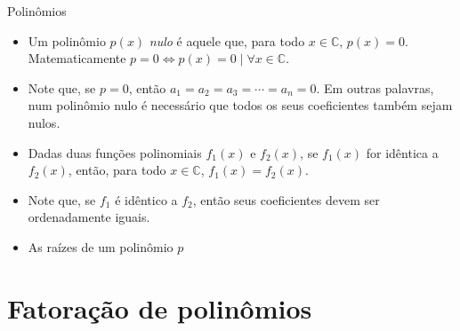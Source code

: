 \documentclass[14pt, aspectratio=169]{beamer}
\newcommand{\C}{\mathbb{C}}
\newcommand{\skipframe}{\vspace{10.0cm}}
\begin{document}
\begin{frame}[allowframebreaks]{Polinômios}
\begin{itemize}
    \skipframe

    \item Um polinômio $p(x)$ \emph{nulo} é aquele que, para todo $x \in \C$, $p(x) = 0$. Matematicamente $p = 0 \Leftrightarrow p(x) = 0 \mid \forall x \in \C$.

    \item Note que, se $p = 0$, então $a_1 = a_2 = a_3 = \cdots = a_n = 0$. Em outras palavras, num polinômio nulo é necessário que todos os seus coeficientes também sejam nulos.

    \skipframe

    \item Dadas duas funções polinomiais $f_1(x)$ e $f_2(x)$, se $f_1(x)$ for idêntica a $f_2(x)$, então, para todo $x \in \C$, $f_1(x) = f_2(x)$.

    \item Note que, se $f_1$ é idêntico a $f_2$, então seus coeficientes devem ser ordenadamente iguais.

    \skipframe

    \item As raízes de um polinômio $p$
\end{itemize}
    
\end{frame}

\section{Fatoração de polinômios}
\end{document}
